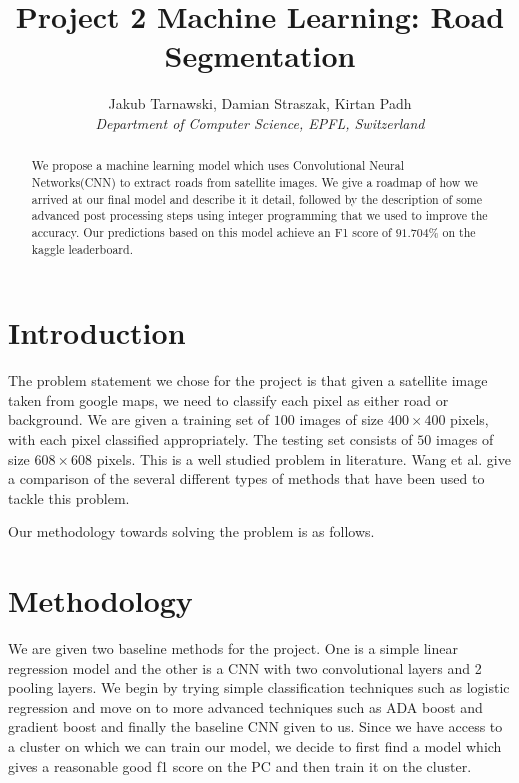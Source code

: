 \documentclass[10pt,conference,compsocconf]{IEEEtran}
\begin{document}
\title{Project 2 Machine Learning: Road Segmentation}

\author{
  Jakub Tarnawski, Damian Straszak, Kirtan Padh \\
  \textit{Department of Computer Science, EPFL, Switzerland}
}

\maketitle

\begin{abstract}
We propose a machine learning model which uses Convolutional Neural Networks(CNN) to extract roads from satellite images. We give a roadmap of how we arrived at our final model and describe it it detail, followed by the description of some advanced post processing steps using integer programming that we used to improve the accuracy. Our predictions based on this model achieve an F1 score of $91.704\%$ on the kaggle leaderboard.
\end{abstract}

\section{Introduction}
The problem statement we chose for the project is that given a satellite image taken from google maps, we need to classify each pixel as either road or background. We are given a training set of $100$ images of size $400 \times 400$ pixels, with each pixel classified appropriately. The testing set consists of $50$ images of size $608 \times 608$ pixels. This is a well studied problem in literature. Wang et al.\cite{wang16} give a comparison of the several different types of methods that have been used to tackle this problem.

Our methodology towards solving the problem is as follows.

\section{Methodology}
We are given two baseline methods for the project. One is a simple linear regression model and the other is a CNN with two convolutional layers and 2 pooling layers. We begin by trying simple classification techniques such as logistic regression and move on to more advanced techniques such as ADA boost and gradient boost and finally the baseline CNN given to us. Since we have access to a cluster on which we can train our model, we decide to first find a model which gives a reasonable good f1 score on the PC and then train it on the cluster.
\end{document}
